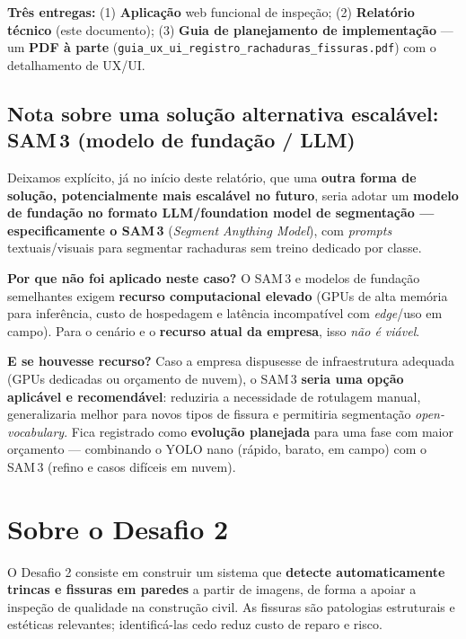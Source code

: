 \documentclass[11pt,a4paper]{article}
\begin{document}
\begin{infobox}
\textbf{Três entregas:} (1) \textbf{Aplicação} web funcional de inspeção;
(2) \textbf{Relatório técnico} (este documento);
(3) \textbf{Guia de planejamento de implementação} — um \textbf{PDF à parte}
(\texttt{guia\_ux\_ui\_registro\_rachaduras\_fissuras.pdf}) com o detalhamento de UX/UI.
\end{infobox}

\subsection{Nota sobre uma solução alternativa escalável: SAM\,3 (modelo de fundação / LLM)}
Deixamos explícito, já no início deste relatório, que uma \textbf{outra forma de solução,
potencialmente mais escalável no futuro}, seria adotar um \textbf{modelo de fundação no
formato LLM/foundation model de segmentação — especificamente o SAM\,3}
(\emph{Segment Anything Model}), com \emph{prompts} textuais/visuais para segmentar
rachaduras sem treino dedicado por classe.

\begin{notebox}
\textbf{Por que não foi aplicado neste caso?} O SAM\,3 e modelos de fundação semelhantes
exigem \textbf{recurso computacional elevado} (GPUs de alta memória para inferência, custo de
hospedagem e latência incompatível com \emph{edge}/uso em campo). Para o cenário e o
\textbf{recurso atual da empresa}, isso \emph{não é viável}.

\textbf{E se houvesse recurso?} Caso a empresa dispusesse de infraestrutura adequada
(GPUs dedicadas ou orçamento de nuvem), o SAM\,3 \textbf{seria uma opção aplicável e
recomendável}: reduziria a necessidade de rotulagem manual, generalizaria melhor para novos
tipos de fissura e permitiria segmentação \emph{open-vocabulary}. Fica registrado como
\textbf{evolução planejada} para uma fase com maior orçamento — combinando o YOLO nano
(rápido, barato, em campo) com o SAM\,3 (refino e casos difíceis em nuvem).
\end{notebox}

\section{Sobre o Desafio 2}
O Desafio 2 consiste em construir um sistema que \textbf{detecte automaticamente trincas e
fissuras em paredes} a partir de imagens, de forma a apoiar a inspeção de qualidade na
construção civil. As fissuras são patologias estruturais e estéticas relevantes; identificá-las
cedo reduz custo de reparo e risco.
\end{document}
